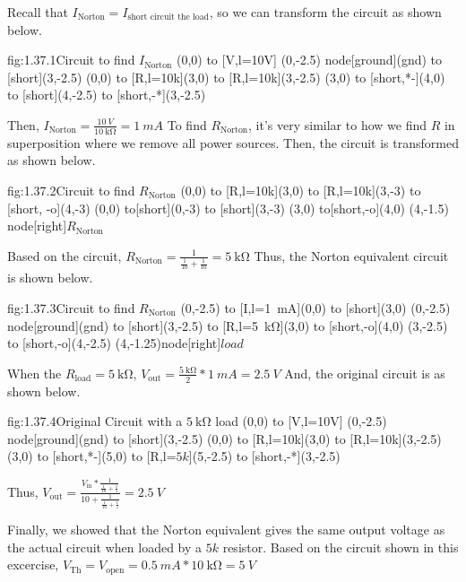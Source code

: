 Recall that $I_\text{Norton} = I_\text{short circuit the load}$, so we can transform the circuit as shown below.
\begin{circuit}{fig:1.37.1}{Circuit to find $I_\text{Norton}$}
    (0,0) to [V,l=10V]
    (0,-2.5) node[ground](gnd){}
    to [short](3,-2.5)
    (0,0) to [R,l=10k](3,0)
    to [R,l=10k](3,-2.5)
    (3,0) to [short,*-](4,0)
    to [short](4,-2.5)
    to [short,-*](3,-2.5)
\end{circuit}
Then, $I_\text{Norton} = \frac{\SI{10}{V}}{\SI{10}{\kohm}}=\SI{1}{mA}$
To find $R_\text{Norton}$, it's very similar to how we find $R$ in superposition where we remove all power sources. Then, the circuit is transformed as shown below.
\begin{circuit}{fig:1.37.2}{Circuit to find $R_\text{Norton}$}
    (0,0) to [R,l=10k](3,0)
    to [R,l=10k](3,-3)
    to [short, -o](4,-3)
    (0,0) to[short](0,-3)
    to [short](3,-3)
    (3,0) to[short,-o](4,0)
    (4,-1.5) node[right]{$R_\text{Norton}$} 
\end{circuit}
Based on the circuit, $R_\text{Norton} = \frac{1}{\frac{1}{10}+\frac{1}{10}} = \SI{5}{\kohm}$
Thus, the Norton equivalent circuit is shown below. 
\begin{circuit}{fig:1.37.3}{Circuit to find $R_\text{Norton}$}
    (0,-2.5) to [I,l=\SI{1}{mA}](0,0)
    to [short](3,0)
    (0,-2.5) node[ground](gnd){}
    to [short](3,-2.5)
    to [R,l=\SI{5}{\kohm}](3,0)
    to [short,-o](4,0)
    (3,-2.5) to [short,-o](4,-2.5) 
    (4,-1.25)node[right]{$load$}
\end{circuit}

When the $R_\text{load} = \SI{5}{\kohm}$, $V_\text{out} = \frac{\SI{5}{\kohm}}{2}*\SI{1}{mA}=\SI{2.5}{V}$ 
And, the original circuit is as shown below. 
\begin{circuit}{fig:1.37.4}{Original Circuit with a $\SI{5}{\kohm}$ load}
    (0,0) to [V,l=10V]
    (0,-2.5) node[ground](gnd){}
    to [short](3,-2.5)
    (0,0) to [R,l=10k](3,0)
    to [R,l=10k](3,-2.5)
    (3,0) to [short,*-](5,0)
    to [R,l=$5k$](5,-2.5)
    to [short,-*](3,-2.5)
\end{circuit}
Thus, $V_\text{out} = \frac{V_\text{in}*\frac{1}{\frac{1}{10}+\frac{1}{5}}}{10+\frac{1}{\frac{1}{10}+\frac{1}{5}}}
                    =\SI{2.5}{V}$


Finally, we showed that the Norton equivalent gives the same output voltage as the actual circuit when loaded by a $5k$ resistor.
Based on the circuit shown in this excercise, $V_\text{Th} = V_\text{open}=\SI{0.5}{mA}*\SI{10}{\kohm}=\SI{5}{V}$

